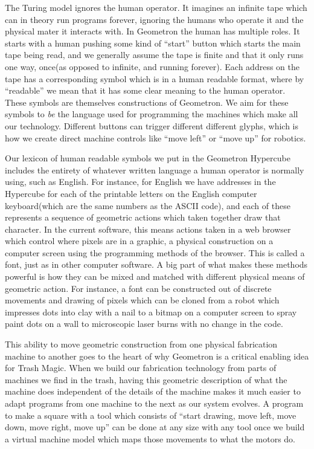 The Turing model ignores the human operator. It imagines an infinite
tape which can in theory run programs forever, ignoring the humans who
operate it and the physical mater it interacts with. In Geometron the
human has multiple roles. It starts with a human pushing some kind of
``start'' button which starts the main tape being read, and we generally
assume the tape is finite and that it only runs one way, once(as opposed
to infinite, and running forever). Each address on the tape has a
corresponding symbol which is in a human readable format, where by
``readable'' we mean that it has some clear meaning to the human
operator. These symbols are themselves constructions of Geometron. We
aim for these symbols to \emph{be} the language used for programming the
machines which make all our technology. Different buttons can trigger
different different glyphs, which is how we create direct machine
controls like ``move left'' or ``move up'' for robotics.

Our lexicon of human readable symbols we put in the Geometron Hypercube
includes the entirety of whatever written language a human operator is
normally using, such as English. For instance, for English we have
addresses in the Hypercube for each of the printable letters on the
English computer keyboard(which are the same numbers as the ASCII code),
and each of these represents a sequence of geometric actions which taken
together draw that character. In the current software, this means
actions taken in a web browser which control where pixels are in a
graphic, a physical construction on a computer screen using the
programming methods of the browser. This is called a font, just as in
other computer software. A big part of what makes these methods powerful
is how they can be mixed and matched with different physical means of
geometric action. For instance, a font can be constructed out of
discrete movements and drawing of pixels which can be cloned from a
robot which impresses dots into clay with a nail to a bitmap on a
computer screen to spray paint dots on a wall to microscopic laser burns
with no change in the code.

This ability to move geometric construction from one physical
fabrication machine to another goes to the heart of why Geometron is a
critical enabling idea for Trash Magic. When we build our fabrication
technology from parts of machines we find in the trash, having this
geometric description of what the machine does independent of the
details of the machine makes it much easier to adapt programs from one
machine to the next as our system evolves. A program to make a square
with a tool which consists of ``start drawing, move left, move down,
move right, move up'' can be done at any size with any tool once we
build a virtual machine model which maps those movements to what the
motors do.


